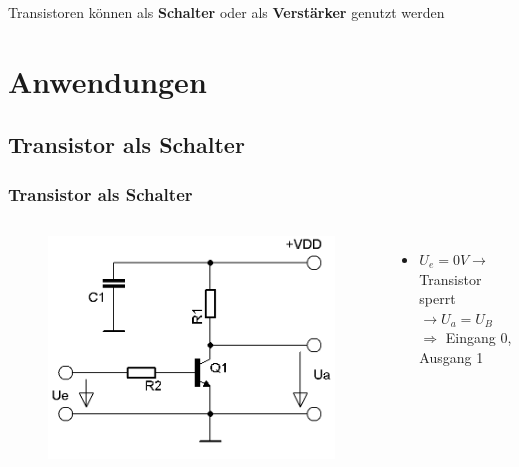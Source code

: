 \begin{frame}
\begin{columns}
\begin{center}
\begin{figure}
      \end{figure}
    \end{center}
  \end{columns}
  Transistoren können als \textbf{Schalter} oder als \textbf{Verstärker} genutzt werden
\end{frame}

\section*{Anwendungen}
\subsection*{Transistor als Schalter}
\begin{frame}
  \frametitle{Transistor als Schalter}
  \begin{columns}
    \begin{center}
      \begin{figure}
        \includegraphics[width=\textwidth,height=.85\textheight,keepaspectratio]{a06/Transistor-Schalter.png}
      \end{figure}
    \end{center}
    \begin{itemize}
      \item $U_e = 0 V \rightarrow$ Transistor sperrt\\ $\rightarrow U_a = U_B$\\ $\Rightarrow$ Eingang 0, Ausgang 1

\end{itemize}
\end{columns}
\end{frame}
